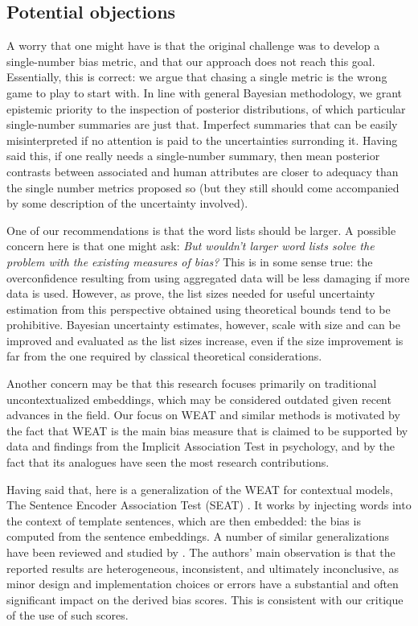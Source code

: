 \documentclass{clv3}
\begin{document}
\hypertarget{potential-objections}{%
	\subsection{Potential objections}\label{potential-objections}}


A worry that one might have is that the original challenge was to develop a single-number bias metric, and that our approach does not reach this goal. Essentially, this is correct: we argue that chasing a single metric is the wrong game to play to start with. In line with general Bayesian methodology, we grant epistemic priority to the inspection of posterior distributions, of which particular single-number summaries are just that. Imperfect summaries that can be easily misinterpreted if no attention is paid to the uncertainties surronding it. Having said this, if one really needs a single-number summary, then mean posterior contrasts between associated and human attributes are closer to adequacy than the single number metrics proposed so  (but they still should come accompanied by some description of the uncertainty involved).

One of our recommendations is that the word lists should be larger. A possible concern here is that one might ask: \emph{But wouldn't larger word lists solve the problem with the existing measures of bias?} This is in some sense true: the overconfidence resulting from using aggregated data will be less damaging if more data is used. However, as \citet{Ethayarajh2020Bernstein} prove, the list sizes needed for useful uncertainty estimation from this perspective obtained using theoretical bounds tend to be prohibitive. Bayesian uncertainty estimates, however, scale with size and can be improved and evaluated as the list sizes increase, even if the size improvement is far from the one required by classical theoretical considerations.  


Another concern may be that this research focuses primarily on traditional uncontextualized embeddings, which may be considered outdated given recent advances in the field. Our focus on WEAT and similar methods is motivated by the fact that WEAT is the main bias measure that is claimed to be supported by data and findings from the Implicit Association Test in psychology, and by the fact that its analogues have seen the most research contributions.

Having said that, here is a generalization of the WEAT for contextual models,  The Sentence Encoder Association Test (SEAT) \citep{may-etal-2019-measuring}.  It works by injecting words into the context of template sentences, which are then embedded: the bias is computed from the sentence embeddings. A number of similar generalizations have been reviewed and studied by \citet{husse-spitz-2022-mind}. The authors' main observation is that the reported results are heterogeneous, inconsistent, and ultimately inconclusive, as minor design and implementation choices or errors have a substantial and often significant impact on the derived bias scores. This is consistent with our critique of the use of such scores. 
\end{document}

